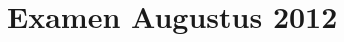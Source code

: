 \documentclass[lineaire_algebra_oplossingen.tex]{subfiles}
\begin{document}
\section{Examen Augustus 2012}
\end{document}
